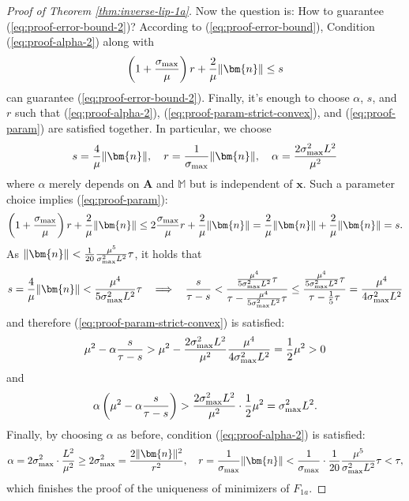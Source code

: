 \documentclass{amsart} %
\def\eqref#1{equation~\ref{#1}}
\def\vn{{\bm{n}}}
\def\vx{{\bm{x}}}
\def\mA{{\bm{A}}}
\def\sM{{\mathbb{M}}}
\theoremstyle{definition}
\theoremstyle{remark}
\renewcommand{\eqref}[1]{\textup{(\ref{#1})}}
\begin{document}
\begin{proof}[Proof of Theorem \ref{thm:inverse-lip-1a}]
Now the question is: How to guarantee \eqref{eq:proof-error-bound-2}? According to \eqref{eq:proof-error-bound}, Condition \eqref{eq:proof-alpha-2} along with 
\begin{equation}
\label{eq:proof-param}
\left(1 + \frac{\sigma_{\textup{max}}}{\mu} \right) r + \frac{2}{\mu} \|\vn\| \leq s
\end{equation}
can guarantee \eqref{eq:proof-error-bound-2}. Finally, it's enough to choose $\alpha$, $s$, and $r$ such that \eqref{eq:proof-alpha-2}, \eqref{eq:proof-param-strict-convex}, and \eqref{eq:proof-param} are satisfied together. In particular, we choose
\[ s = \frac{4}{\mu} \|\vn\|, \quad r = \frac{1}{\sigma_{\textup{max}}} \|\vn\| , \quad \alpha = \frac{2\sigma^2_{\textup{max}}L^2}{\mu^2}\]
where $\alpha$ merely depends on $\mA$ and $\sM$ but is independent of $\vx$. Such a parameter choice implies \eqref{eq:proof-param}:
\[  \left(1 + \frac{\sigma_{\textup{max}}}{\mu} \right) r + \frac{2}{\mu} \|\vn\| \leq 2 \frac{\sigma_{\textup{max}}}{\mu} r + \frac{2}{\mu} \|\vn\| = \frac{2}{\mu} \|\vn\| + \frac{2}{\mu} \|\vn\| = s. \]
As $\|\vn\| < \frac{1}{20}\frac{\mu^5}{\sigma^2_{\textup{max}}L^2} \tau$, it holds that
\[ s = \frac{4}{\mu} \|\vn\| < \frac{\mu^4}{5 \sigma^2_{\textup{max}}L^2} \tau 
~~ \implies ~~
\frac{s}{\tau-s}  
< \frac{\frac{\mu^4}{5 \sigma^2_{\textup{max}}L^2} \tau}{\tau - \frac{\mu^4}{5 \sigma^2_{\textup{max}}L^2} \tau} 
\leq \frac{\frac{\mu^4}{5 \sigma^2_{\textup{max}}L^2} \tau}{\tau - \frac{1}{5} \tau} = \frac{\mu^4}{4 \sigma^2_{\textup{max}}L^2}
\]
and therefore \eqref{eq:proof-param-strict-convex} is satisfied:
\[ 
\mu^2 - \alpha \frac{s}{\tau - s} > \mu^2 - \frac{2\sigma^2_{\textup{max}}L^2}{\mu^2} \frac{\mu^4}{4 \sigma^2_{\textup{max}}L^2} = \frac{1}{2}\mu^2 > 0 \]
and
\[\alpha \left(\mu^2 - \alpha \frac{s}{\tau - s}\right) > \frac{2\sigma^2_{\textup{max}}L^2}{\mu^2} \cdot \frac{1}{2}\mu^2 = \sigma^2_{\textup{max}}L^2.
\]
Finally, by choosing $\alpha$ as before, condition \eqref{eq:proof-alpha-2} is satisfied:
\[ \alpha = 2\sigma^2_{\textup{max}} \cdot \frac{L^2}{\mu^2} \geq 2\sigma^2_{\textup{max}} = \frac{2 \|\vn\|^2}{r^2},
\quad 
r = \frac{1}{\sigma_{\textup{max}}} \|\vn\| < \frac{1}{\sigma_{\textup{max}}} \cdot \frac{1}{20}\frac{\mu^5}{\sigma^2_{\textup{max}}L^2} \tau < \tau,
\]
which finishes the proof of the uniqueness of minimizers of $F_{1a}$.


\end{proof}
\end{document}

